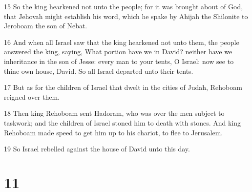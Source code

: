 \par 15 So the king hearkened not unto the people; for it was brought about of God, that Jehovah might establish his word, which he spake by Ahijah the Shilonite to Jeroboam the son of Nebat.
\par 16 And when all Israel saw that the king hearkened not unto them, the people answered the king, saying, What portion have we in David? neither have we inheritance in the son of Jesse: every man to your tents, O Israel: now see to thine own house, David. So all Israel departed unto their tents.
\par 17 But as for the children of Israel that dwelt in the cities of Judah, Rehoboam reigned over them.
\par 18 Then king Rehoboam sent Hadoram, who was over the men subject to taskwork; and the children of Israel stoned him to death with stones. And king Rehoboam made speed to get him up to his chariot, to flee to Jerusalem.
\par 19 So Israel rebelled against the house of David unto this day.

\chapter{11}

